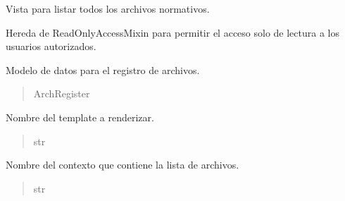 \documentclass[letterpaper,10pt,spanish]{sphinxmanual}
\begin{document}
\begin{fulllineitems}

\pysigstartsignatures
{}
\pysigstopsignatures
\sphinxAtStartPar
Vista para listar todos los archivos normativos.

\sphinxAtStartPar
Hereda de ReadOnlyAccessMixin para permitir el acceso solo de lectura
a los usuarios autorizados.


\begin{fulllineitems}

\pysigstartsignatures
{}
\pysigstopsignatures
\sphinxAtStartPar
Modelo de datos para el registro de archivos.
\begin{quote}\begin{description}
\sphinxAtStartPar
ArchRegister

\end{description}\end{quote}

\end{fulllineitems}



\begin{fulllineitems}

\pysigstartsignatures
{}
\pysigstopsignatures
\sphinxAtStartPar
Nombre del template a renderizar.
\begin{quote}\begin{description}
\sphinxAtStartPar
str

\end{description}\end{quote}

\end{fulllineitems}



\begin{fulllineitems}

\pysigstartsignatures
{}
\pysigstopsignatures
\sphinxAtStartPar
Nombre del contexto que contiene la lista de archivos.
\begin{quote}\begin{description}
\sphinxAtStartPar
str


\end{description}
\end{quote}
\end{fulllineitems}
\end{fulllineitems}
\end{document}
